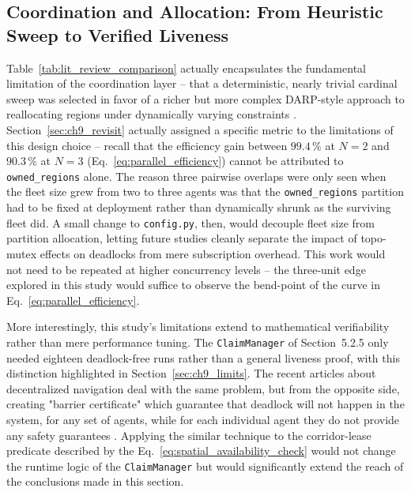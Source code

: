 \subsection{Coordination and Allocation: From Heuristic Sweep to Verified Liveness}

Table~\ref{tab:lit_review_comparison} actually encapsulates the fundamental limitation of the coordination layer -- that a deterministic, nearly trivial cardinal sweep was selected in favor of a richer but more complex DARP-style approach to reallocating regions under dynamically varying constraints \cite{sharma2026darp}. Section~\ref{sec:ch9_revisit} actually assigned a specific metric to the limitations of this design choice -- recall that the efficiency gain between $99.4\,\%$ at $N=2$ and $90.3\,\%$ at $N=3$ (Eq.~\eqref{eq:parallel_efficiency}) cannot be attributed to \texttt{owned\_regions} alone. The reason three pairwise overlaps were only seen when the fleet size grew from two to three agents was that the \texttt{owned\_regions} partition had to be fixed at deployment rather than dynamically shrunk as the surviving fleet did. A small change to \texttt{config.py}, then, would decouple fleet size from partition allocation, letting future studies cleanly separate the impact of topo-mutex effects on deadlocks from mere subscription overhead. This work would not need to be repeated at higher concurrency levels -- the three-unit edge explored in this study would suffice to observe the bend-point of the curve in Eq.~\eqref{eq:parallel_efficiency}.

More interestingly, this study's limitations extend to mathematical verifiability rather than mere performance tuning. The \texttt{ClaimManager} of Section~5.2.5 only needed eighteen deadlock-free runs rather than a general liveness proof, with this distinction highlighted in Section~\ref{sec:ch9_limits}. The recent articles about decentralized navigation deal with the same problem, but from the opposite side, creating "barrier certificate" which guarantee that deadlock will not happen in the system, for any set of agents, while for each individual agent they do not provide any safety guarantees \cite{chandra2025deadlock}. Applying the similar technique to the corridor-lease predicate described by the Eq.~\eqref{eq:spatial_availability_check} would not change the runtime logic of the \texttt{ClaimManager} but would significantly extend the reach of the conclusions made in this section.

